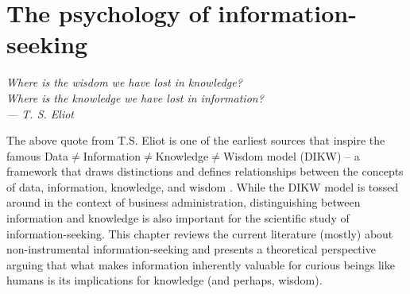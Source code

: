 




\chapter{The psychology of information-seeking}\label{ch:psychology}

\begin{flushright}{\slshape
    Where is the wisdom we have lost in knowledge? \\
    Where is the knowledge we have lost in information? \\
    --- T. S. Eliot \cite{eliot_rock_2014}}
\end{flushright}
The above quote from T.S. Eliot is one of the earliest sources that inspire the famous Data$\neq$Information$\neq$Knowledge$\neq$Wisdom model (DIKW) -- a framework that draws distinctions and defines relationships between the concepts of data, information, knowledge, and wisdom \cite{sharma_5_2008}. While the DIKW model is tossed around in the context of business administration, distinguishing between information and knowledge is also important for the scientific study of information-seeking. This chapter reviews the current literature (mostly) about non-instrumental information-seeking and presents a theoretical perspective arguing that what makes information inherently valuable for curious beings like humans is its implications for knowledge (and perhaps, wisdom).

